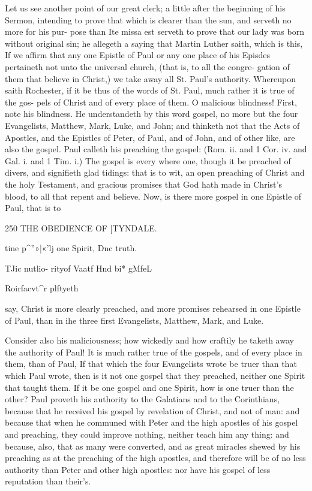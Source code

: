 \documentclass{custom}
\begin{document}
{Let us see another point of our great clerk; a little after
the beginning of his Sermon, intending to prove that which
is clearer than the sun, and serveth no more for his pur-
pose than Ite missa est serveth to prove that our lady was 
born without original sin; he allegeth a saying that Martin 
Luther saith, which is this, If we affirm that any one 
Epistle of Paul or any one place of his Episdes pertaineth 
not unto the universal church, (that is, to all the congre- 
gation of them that believe in Christ,) we take away all St. 
Paul's authority. Whereupon saith Rochester, if it be thus 
of the words of St. Paul, much rather it is true of the gos- 
pels of Christ and of every place of them. O malicious 
blindness! First, note his blindness. He understandeth 
by this word gospel, no more but the four Evangelists, 
Matthew, Mark, Luke, and John; and thinketh not that 
the Acts of Apostles, and the Epistles of Peter, of Paul,
and of John, and of other like, are also the gospel. Paul
calleth his preaching the gospel: (Rom. ii. and 1 Cor. iv.
and Gal. i. and 1 Tim. i.) The gospel is every where 
one, though it be preached of divers, and signifieth glad
tidings: that is to wit, an open preaching of Christ and
the holy Testament, and gracious promises that God hath 
made in Christ's blood, to all that repent and believe. 
Now, is there more gospel in one Epistle of Paul, that is to 


250
THE OBEDIENCE OF
[TYNDALE.

tine p^''»|«'lj 
one Spirit, 
Dnc truth. 

TJic nutlio- 
rityof Vaatf 
Hnd bi* 
gMfeL 

Roirfacvt^r 
plftyeth 

say, Christ is more clearly preached, and more promises 
rehearsed in one Epistle of Paul, than in ihe three first 
Evangelists, Matthew, Mark, and Luke. 

Consider also his maliciousness; how wickedly and how 
craftily he taketh away the authority of Paul! It is much 
rather true of the gospels, and of every place in them, than 
of Paul, If that which the four Evangelists wrote be 
truer than that which Paul wrote, then is it not one gospel 
that they preached, neither one Spirit that taught them.
If it be one gospel and one Spirit, how is one truer than 
the other? Paul proveth his authority to the Galatians 
and to the Corinthians, because that he received his gospel 
by revelation of Christ, and not of man: and because that 
when he communed with Peter and the high apostles of 
his gospel and preaching, they could improve nothing, 
neither teach him any thing: and because, also, that as 
many were converted, and as great miracles shewed by his 
preaching as at the preaching of the high apostles, and 
therefore will be of no less authority than Peter and other 
high apostles: nor have his gospel of less reputation 
than their's. 

}
\end{document}
